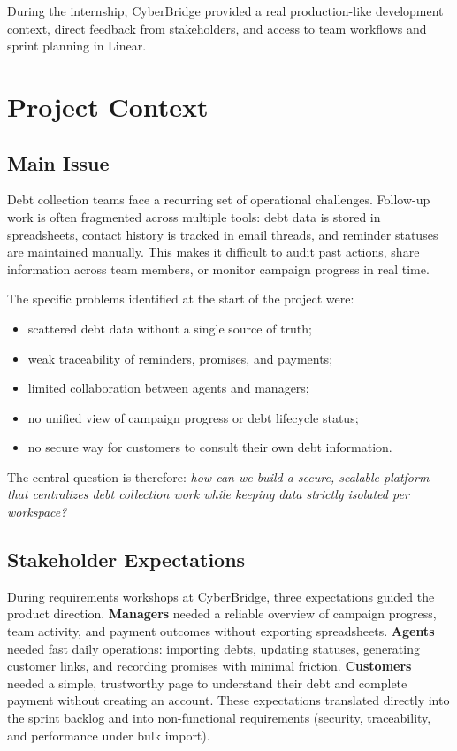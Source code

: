 \documentclass[12pt,a4paper]{report}
\begin{document}
During the internship, CyberBridge provided a real production-like development context,
direct feedback from stakeholders, and access to team workflows and sprint planning
in Linear.

\section{Project Context}

\subsection{Main Issue}

Debt collection teams face a recurring set of operational challenges.
Follow-up work is often fragmented across multiple tools: debt data is stored in
spreadsheets, contact history is tracked in email threads, and reminder statuses are
maintained manually.
This makes it difficult to audit past actions, share information across team members,
or monitor campaign progress in real time.

The specific problems identified at the start of the project were:
\begin{itemize}
  \item scattered debt data without a single source of truth;
  \item weak traceability of reminders, promises, and payments;
  \item limited collaboration between agents and managers;
  \item no unified view of campaign progress or debt lifecycle status;
  \item no secure way for customers to consult their own debt information.
\end{itemize}

The central question is therefore: \emph{how can we build a secure, scalable platform
that centralizes debt collection work while keeping data strictly isolated per workspace?}

\subsection{Stakeholder Expectations}

During requirements workshops at CyberBridge, three expectations guided the product direction.
\textbf{Managers} needed a reliable overview of campaign progress, team activity, and payment
outcomes without exporting spreadsheets.
\textbf{Agents} needed fast daily operations: importing debts, updating statuses, generating
customer links, and recording promises with minimal friction.
\textbf{Customers} needed a simple, trustworthy page to understand their debt and complete
payment without creating an account.
These expectations translated directly into the sprint backlog and into non-functional
requirements (security, traceability, and performance under bulk import).
\end{document}
